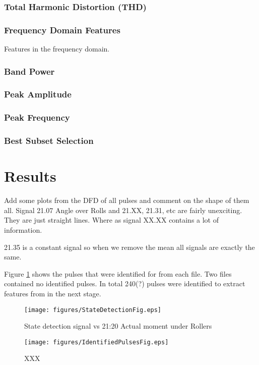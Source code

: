 \documentclass{article}
\begin{document}
\subsubsection{Total Harmonic Distortion (THD)}   

\subsubsection{Frequency Domain Features}
Features in the frequency domain.
\subsubsection{Band Power}
\subsubsection{Peak Amplitude}
\subsubsection{Peak Frequency}
\subsubsection{Best Subset Selection}

\newpage  
\section{Results}
Add some plots from the DFD of all pulses and comment on the shape of them all.
Signal 21.07 Angle over Rolls and 21.XX, 21.31, etc are fairly unexciting. They are just straight lines.
Where as signal XX.XX contains a lot of information.

21.35 is a constant signal so when we remove the mean all signals are exactly the same.

Figure \ref{fig:StateDetection} shows the pulses that were identified for from each file. Two files contained no identified pulses. In total 240(?) pulses were identified to extract features from in the next stage.

\begin{figure}[!ht]
    \centering
    \texttt{[image: figures/StateDetectionFig.eps]}
    \caption{State detection signal vs 21:20 Actual moment under Rollers}
    \label{fig:StateDetection}
\end{figure}

\begin{figure}[!ht]
    \centering
    \texttt{[image: figures/IdentifiedPulsesFig.eps]}
    \caption{XXX}
    \label{fig:IdentifiedPulses}
\end{figure}
\end{document}
